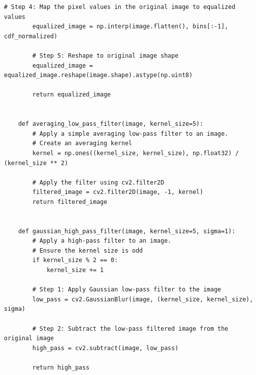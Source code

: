 \documentclass[11pt, conference, letterpaper]{IEEEtran}
\begin{document}
\begin{lstlisting}[style=python, caption={\texttt{image\_utils.py}}, label={lst:iutils}]
        # Step 4: Map the pixel values in the original image to equalized values
        equalized_image = np.interp(image.flatten(), bins[:-1], cdf_normalized)
    
        # Step 5: Reshape to original image shape
        equalized_image = equalized_image.reshape(image.shape).astype(np.uint8)
    
        return equalized_image
    
    
    def averaging_low_pass_filter(image, kernel_size=5):
        # Apply a simple averaging low-pass filter to an image.
        # Create an averaging kernel
        kernel = np.ones((kernel_size, kernel_size), np.float32) / (kernel_size ** 2)
    
        # Apply the filter using cv2.filter2D
        filtered_image = cv2.filter2D(image, -1, kernel)
        return filtered_image
    
    
    def gaussian_high_pass_filter(image, kernel_size=5, sigma=1):
        # Apply a high-pass filter to an image.
        # Ensure the kernel size is odd
        if kernel_size % 2 == 0:
            kernel_size += 1
        
        # Step 1: Apply Gaussian low-pass filter to the image
        low_pass = cv2.GaussianBlur(image, (kernel_size, kernel_size), sigma)
        
        # Step 2: Subtract the low-pass filtered image from the original image
        high_pass = cv2.subtract(image, low_pass)
        
        return high_pass
\end{lstlisting}
\end{document}
